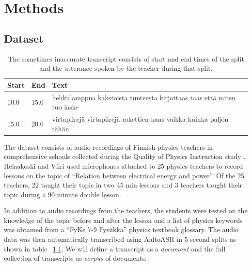 \documentclass[utf8,english]{gradu3}
\begin{document}


\chapter{Methods}


\section{Dataset}

\begin{table}[]
  \begin{tabular}{ | l | l | l |}
  \hline
  \textbf{Start} & \textbf{End}  & \textbf{Text} \\ \hline
  10.0 & 15.0 & hehkulamppua kakstoista tunteesta kirjottaas taas että miten tuo laske\\ \hline
  15.0 & 20.0 & virtapiirejä virtapiirejä rakettien kans vaikka kuinka paljon tähän\\
  \hline
  \end{tabular}
  \caption{The sometimes inaccurate transcript consists of start and end times of the split and the utterance spoken by the teacher during that split.}
  \label{table:transcript}
\end{table}


The dataset consists of audio recordings of Finnish physics teachers in comprehensive schools collected during the Quality of Physics Instruction study \parencite{fischerQualityInstructionPhysics2014,helaakoskiContentContentStructure2014}. Helaakoski and Viiri \parencite*{helaakoskiContentContentStructure2014} used microphones attached to 25 physics teachers to record lessons on the topic of \enquote{Relation between electrical energy and power}. Of the 25 teachers, 22 taught their topic in two 45 min lessons and 3 teachers taught their topic during a 90 minute double lesson. 

In addition to audio recordings from the teachers, the students were tested on the knowledge of the topic before and after the lesson and a list of physics keywords was obtained from a \enquote{FyKe 7-9 Fysiikka}\parencite{kangaskorteFyKeFysiikkaOPS2016} physics textbook glossary. The audio data was then automatically transcribed using AaltoASR in 5 second splits \parencite{hirsimakiImportanceHighOrderNGram2009} as shown in table ~\ref{table:transcript}. We will define a transcript as a \emph{document} and the full collection of transcripts as \emph{corpus} of documents.
\end{document}
